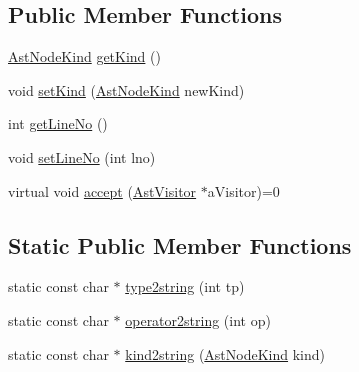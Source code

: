 \subsection*{Public Member Functions}
\begin{DoxyCompactItemize}
\item 
\hyperlink{classAstNode_a365f519b5e9e517edc83566bd1cfe950}{AstNodeKind} \hyperlink{classAstNode_ac18055137cc3544e330c42f0c41acf86}{getKind} ()
\item 
void \hyperlink{classAstNode_a1d7bf9b1d9cd668d155ddd86d22bc727}{setKind} (\hyperlink{classAstNode_a365f519b5e9e517edc83566bd1cfe950}{AstNodeKind} newKind)
\item 
int \hyperlink{classAstNode_a93ce204950529a50b86813904e03dfd7}{getLineNo} ()
\item 
void \hyperlink{classAstNode_abe694eb81a2d9042c571ecc2ca8d38e8}{setLineNo} (int lno)
\item 
virtual void \hyperlink{classAstNode_a67b2d6ce1262da2954fb4db255759fb3}{accept} (\hyperlink{classAstVisitor}{AstVisitor} $\ast$aVisitor)=0
\end{DoxyCompactItemize}
\subsection*{Static Public Member Functions}
\begin{DoxyCompactItemize}
\item 
static const char $\ast$ \hyperlink{classAstNode_a6b77773e4a27d8ca40bc1fce09d4764e}{type2string} (int tp)
\item 
static const char $\ast$ \hyperlink{classAstNode_abb3df00672c92269af102f415b9acf62}{operator2string} (int op)
\item 
static const char $\ast$ \hyperlink{classAstNode_a9579a36e66ca9449b8aac87f0bf8f832}{kind2string} (\hyperlink{classAstNode_a365f519b5e9e517edc83566bd1cfe950}{AstNodeKind} kind)
\end{DoxyCompactItemize}
